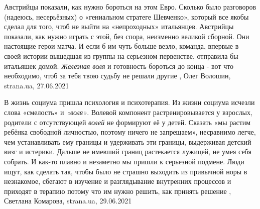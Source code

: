 Австрийцы показали, как нужно бороться на этом Евро.  Сколько было разговоров
(надеюсь, несерьёзных) о «гениальном стратеге Шевченко», который все якобы
сделал для того, чтоб не выйти на «непроходных» итальянцев. Австрийцы показали,
как нужно играть с этой, без спора, неизменно великой сборной.  Они настоящие
герои матча. И если б им чуть больше везло, команда, впервые в своей истории
вышедшая из группы на серьезном первенстве, отправила бы итальяшек домой.
\emph{Железная воля} и готовность бороться до конца - вот что необходимо, чтоб за тебя
твою судьбу не решали другие
, 
Олег Волошин, strana.ua, 27.06.2021

В жизнь социума пришла психология и психотерапия. Из жизни социума исчезли
слова «смелость» и \emph{«воля»}. Волевой компонент растренировывается у взрослых,
родители с отсутствующей \emph{волей} не формируют её у детей. Сказать «мы растим
ребёнка свободной личностью, поэтому ничего не запрещаем», несравнимо легче,
чем устанавливать ему границы и удерживать эти границы, выдерживая детский визг
и истерики. Дальше не имевший границ растекается лужицей, не умея себя собрать.
И как-то плавно и незаметно мы пришли к серьезной подмене. Люди ищут, как
сделать так, чтобы было не страшно выходить из привычной норы в незнакомое,
сбегают в изучение и разглядывание внутренних процессов и приходят в терапию
потому что им нужно решить, как принять решение
, 
Светлана Комарова, strana.ua, 29.06.2021

